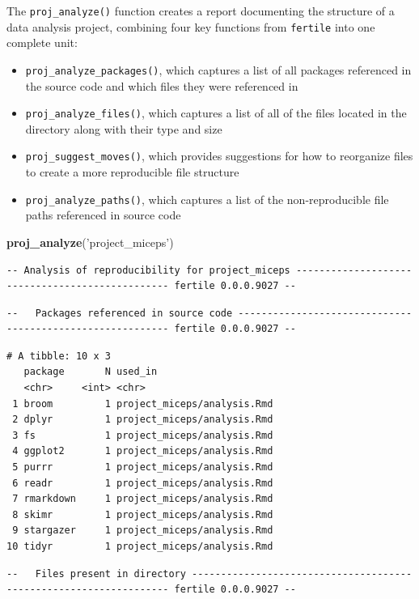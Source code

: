 \documentclass[12pt,twoside]{reedthesis}
\newenvironment{Shaded}{\begin{snugshade}}{\end{snugshade}}
\newcommand{\KeywordTok}[1]{\textcolor[rgb]{0.13,0.29,0.53}{\textbf{#1}}}
\newcommand{\StringTok}[1]{\textcolor[rgb]{0.31,0.60,0.02}{#1}}
\newcommand{\NormalTok}[1]{#1}
\providecommand{\tightlist}{%
  \setlength{\itemsep}{0pt}\setlength{\parskip}{0pt}}
\begin{document}
The \texttt{proj\_analyze()} function creates a report documenting the
structure of a data analysis project, combining four key functions from
\texttt{fertile} into one complete unit:
\begin{itemize}
\tightlist
\item
  \texttt{proj\_analyze\_packages()}, which captures a list of all
  packages referenced in the source code and which files they were
  referenced in
\item
  \texttt{proj\_analyze\_files()}, which captures a list of all of the
  files located in the directory along with their type and size
\item
  \texttt{proj\_suggest\_moves()}, which provides suggestions for how to
  reorganize files to create a more reproducible file structure
\item
  \texttt{proj\_analyze\_paths()}, which captures a list of the
  non-reproducible file paths referenced in source code
\end{itemize}
\footnotesize
\begin{Shaded}
\begin{Highlighting}[]
\KeywordTok{proj_analyze}\NormalTok{(}\StringTok{'project_miceps'}\NormalTok{)}
\end{Highlighting}
\end{Shaded}
\begin{verbatim}
-- Analysis of reproducibility for project_miceps ------------------------------------------------ fertile 0.0.0.9027 --
\end{verbatim}
\begin{verbatim}
--   Packages referenced in source code ---------------------------------------------------------- fertile 0.0.0.9027 --
\end{verbatim}
\begin{verbatim}
# A tibble: 10 x 3
   package       N used_in                    
   <chr>     <int> <chr>                      
 1 broom         1 project_miceps/analysis.Rmd
 2 dplyr         1 project_miceps/analysis.Rmd
 3 fs            1 project_miceps/analysis.Rmd
 4 ggplot2       1 project_miceps/analysis.Rmd
 5 purrr         1 project_miceps/analysis.Rmd
 6 readr         1 project_miceps/analysis.Rmd
 7 rmarkdown     1 project_miceps/analysis.Rmd
 8 skimr         1 project_miceps/analysis.Rmd
 9 stargazer     1 project_miceps/analysis.Rmd
10 tidyr         1 project_miceps/analysis.Rmd
\end{verbatim}
\begin{verbatim}
--   Files present in directory ------------------------------------------------------------------ fertile 0.0.0.9027 --
\end{verbatim}
\end{document}
